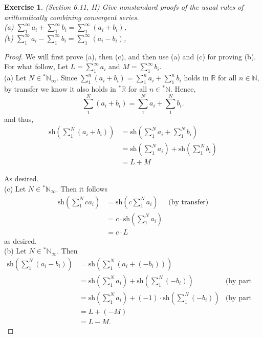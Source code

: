 \documentclass[a4paper, 11pt, openany]{book}
\theoremstyle{plain}
\newtheorem{exercise}{Exercise}[chapter]
\theoremstyle{plain}
\newcommand{\N}{\mathbb{N}}
\newcommand{\R}{\mathbb{R}}
\newcommand{\hyp}{{}^*}
\newcommand{\sh}{\text{sh}}
\begin{document}
  \begin{exercise}
    (Section 6.11, II)
    Give nonstandard proofs of the usual rules of arithemtically combining convergent series. \\
    (a) $\sum_{1}^\infty a_i+\sum_{1}^\infty b_i=\sum_{1}^\infty (a_i+b_i)$, \\
    (b) $\sum_1^\infty a_i-\sum_1^\infty b_i=\sum_1^\infty (a_i-b_i)$,
  \end{exercise}
  \begin{proof} We will first prove (a), then (c), and then use (a) and (c) for proving (b). For what follow, Let $L=\sum_{1}^\infty a_i$ and $M=\sum_{1}^\infty b_i$. \\
    (a) Let $N \in \hyp \N_\infty$. Since $\sum_{1}^n (a_i+b_i)=\sum_{1}^n a_i+\sum_{1}^n b_i$ holds in $\R$ for all $n \in \N$, by transfer we know it also holds in $\hyp \R$ for all $n \in \hyp \N$. Hence, $$\sum_{1}^N (a_i+b_i)=\sum_{1}^N a_i+\sum_{1}^N b_i.$$ and thus, 
    \begin{align*}
      \sh \left(\sum_{1}^N (a_i+b_i)\right) &=\sh \left(\sum_{1}^N a_i+\sum_{1}^N b_i \right) \\
      &=\sh \left(\sum_{1}^N a_i \right)+\sh \left( \sum_{1}^N b_i \right) \\
      &= L+M
    \end{align*}

    As desired. \\

    (c) Let $N \in \hyp \N_\infty$. Then it follows 
    \begin{align*}
      \sh \left( \sum_{1}^N ca_i \right) &= \sh \left(c\sum_1^N a_i \right) &\text{(by transfer)}\\
      &= c\cdot \sh \left( \sum_1^N a_i \right) \\
      &=c \cdot L
    \end{align*}
    as desired. \\

    (b) Let $N \in \hyp \N_\infty$. Then 
    \begin{align*}
      \sh \left( \sum_1^N (a_i-b_i)\right) &= \sh \left( \sum_1^N (a_i+(-b_i))\right) \\
      &=\sh \left(\sum_{1}^N a_i \right)+\sh \left( \sum_{1}^N (-b_i) \right) &\text{(by part a)}\\
      &= \sh \left(\sum_{1}^N a_i \right) +(-1) \cdot \sh \left( \sum_{1}^N (-b_i) \right) &\text{(by part c)} \\
      &=L+(-M) \\
      &=L-M.
    \end{align*}
  \end{proof}
\end{document}
